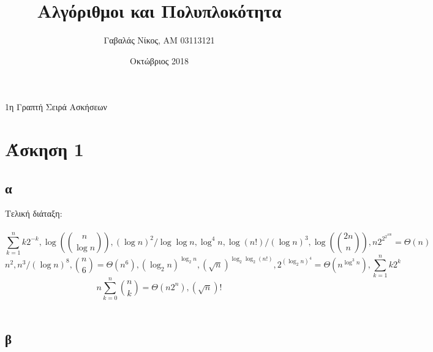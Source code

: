 \documentclass[12pt,a4paper]{article}
\title{Αλγόριθμοι και Πολυπλοκότητα}
\author{Γαβαλάς Νίκος, AM 03113121}
\date{Οκτώβριος 2018}
\begin{document}
  \maketitle

  \begin{center}
    \Large{1η Γραπτή Σειρά Ασκήσεων}
  \end{center}

  \section{Άσκηση 1}

  \subsection{α}
    Τελική διάταξη:\\
    \\
    \[  \sum_{k=1}^{n}k2^{-k}, 
    \log(\binom{n}{\log{n}}), 
    (\log{n})^2/\log\log{n}, 
    \log^{4}n,
    \log(n!)/(\log{n})^3, 
    \log(\binom{2n}{n}), 
    n2^{2^{2^{100}}}=\Theta(n)
    \]
    \[
    n^2, 
    n^3/(\log{n})^8,
    \binom{n}{6}=\Theta(n^6),
    (\log_{2}{n})^{\log_{2}{n}},
    (\sqrt{n})^{\log_{2}\log_{2}(n!)},
    2^{(\log_{2}{n})^4}=\Theta(n^{\log^3{n}}),
    \sum_{k=1}^{n}k2^k
    \]
    \[
    n\sum_{k=0}^{n}\binom{n}{k}=\Theta(n2^n),
    (\sqrt{n})!
    \]
    \\

  \subsection{β}
\end{document}
